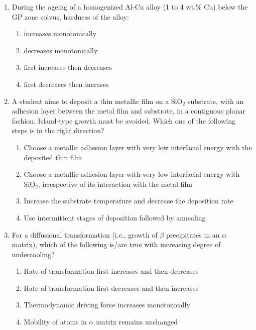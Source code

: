 \documentclass[journal,,12pt,onecolumn]{IEEEtran}
\theoremstyle{remark}
\begin{document}
\begin{enumerate}
\begin{figure}[H]
\end{figure}
\begin{enumerate}
\end{enumerate}
\bigskip
\item During the ageing of a homogenized Al-Cu alloy (1 to 4 wt.\% Cu) below the GP zone solvus, hardness of the alloy:
\begin{enumerate}
        \item increases monotonically
        \item decreases monotonically
        \item first increases then  decreases
        \item first decreases then incrases 
\end{enumerate}
\bigskip
\item A student aims to deposit a thin metallic film on a SiO$_2$ substrate, with an adhesion layer between the metal film and substrate, in a contiguous planar fashion. Island-type growth must be avoided. Which one of the following steps is in the right direction?
\begin{enumerate}

        \item Choose a metallic adhesion layer with very low interfacial energy with the deposited thin film
        \item Choose a metallic adhesion layer with very low interfacial energy with SiO$_2$, irrespective of its interaction with the metal film
        \item Increase the substrate temperature and decrease the deposition rate
        \item Use intermittent stages of deposition followed by annealing

\end{enumerate}
\bigskip
\item For a diffusional transformation (i.e., growth of $\beta$ precipitates in an $\alpha$ matrix), which of the following is/are true with increasing degree of undercooling? 
\begin{enumerate}
    \item Rate of transformation first increases and then decreases
    \item Rate of transformation first decreases and then increases
    \item Thermodynamic driving force increases monotonically
    \item Mobility of atoms in $\alpha$ matrix remains unchanged


\end{enumerate}
\end{enumerate}
\end{document}

